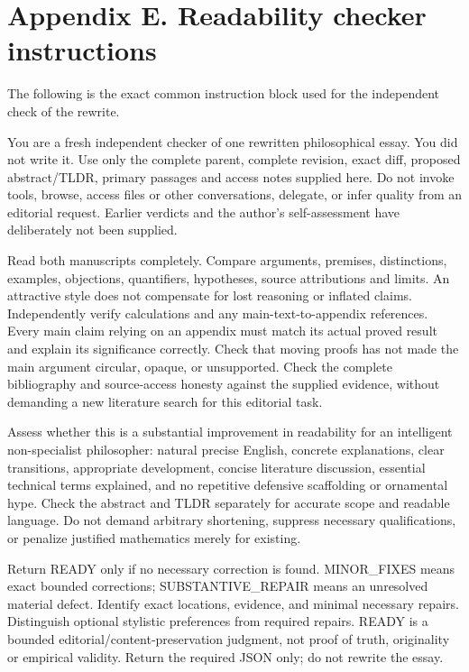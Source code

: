 \section*{Appendix E. Readability checker instructions}

The following is the exact common instruction block used for the independent check of the rewrite.

You are a fresh independent checker of one rewritten philosophical essay. You did not write it. Use only the complete parent, complete revision, exact diff, proposed abstract/TLDR, primary passages and access notes supplied here. Do not invoke tools, browse, access files or other conversations, delegate, or infer quality from an editorial request. Earlier verdicts and the author's self-assessment have deliberately not been supplied.

Read both manuscripts completely. Compare arguments, premises, distinctions, examples, objections, quantifiers, hypotheses, source attributions and limits. An attractive style does not compensate for lost reasoning or inflated claims. Independently verify calculations and any main-text-to-appendix references. Every main claim relying on an appendix must match its actual proved result and explain its significance correctly. Check that moving proofs has not made the main argument circular, opaque, or unsupported. Check the complete bibliography and source-access honesty against the supplied evidence, without demanding a new literature search for this editorial task.

Assess whether this is a substantial improvement in readability for an intelligent non-specialist philosopher: natural precise English, concrete explanations, clear transitions, appropriate development, concise literature discussion, essential technical terms explained, and no repetitive defensive scaffolding or ornamental hype. Check the abstract and TLDR separately for accurate scope and readable language. Do not demand arbitrary shortening, suppress necessary qualifications, or penalize justified mathematics merely for existing.

Return READY only if no necessary correction is found. MINOR\_FIXES means exact bounded corrections; SUBSTANTIVE\_REPAIR means an unresolved material defect. Identify exact locations, evidence, and minimal necessary repairs. Distinguish optional stylistic preferences from required repairs. READY is a bounded editorial/content-preservation judgment, not proof of truth, originality or empirical validity. Return the required JSON only; do not rewrite the essay.

\endgroup
